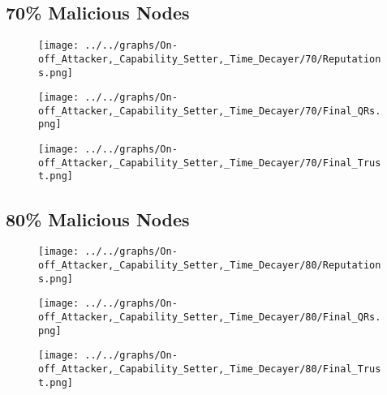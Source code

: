\begin{minipage}[t]{0.49\columnwidth}
\subsection*{70\% Malicious Nodes}
    \begin{figure}[H]
        \centering
        \texttt{[image: ../../graphs/On-off\_Attacker,\_Capability\_Setter,\_Time\_Decayer/70/Reputations.png]}
    \end{figure}
    \begin{figure}[H]
        \centering
        \texttt{[image: ../../graphs/On-off\_Attacker,\_Capability\_Setter,\_Time\_Decayer/70/Final\_QRs.png]}
    \end{figure}
\end{minipage}
\begin{minipage}[t]{0.49\columnwidth}
    \begin{figure}[H]
        \centering
        \texttt{[image: ../../graphs/On-off\_Attacker,\_Capability\_Setter,\_Time\_Decayer/70/Final\_Trust.png]}
    \end{figure}
\end{minipage}

\begin{minipage}[t]{0.49\columnwidth}
\subsection*{80\% Malicious Nodes}
    \begin{figure}[H]
        \centering
        \texttt{[image: ../../graphs/On-off\_Attacker,\_Capability\_Setter,\_Time\_Decayer/80/Reputations.png]}
    \end{figure}
    \begin{figure}[H]
        \centering
        \texttt{[image: ../../graphs/On-off\_Attacker,\_Capability\_Setter,\_Time\_Decayer/80/Final\_QRs.png]}
    \end{figure}
\end{minipage}
\begin{minipage}[t]{0.49\columnwidth}
    \begin{figure}[H]
        \centering
        \texttt{[image: ../../graphs/On-off\_Attacker,\_Capability\_Setter,\_Time\_Decayer/80/Final\_Trust.png]}
    \end{figure}
\end{minipage}

